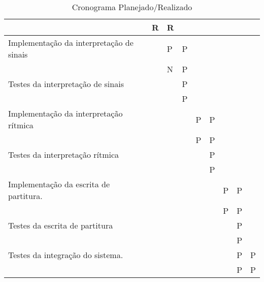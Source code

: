 {\begin{table}[]
\begin{tabular}{|p{5cm}|l|l|l|l|l|l|l|l|l|}
 &  & \cellcolor[HTML]{34FF34}R & \cellcolor[HTML]{34FF34}R &  &  &  &  &  &  \\ \hline
Implementação da interpretação de sinais &  &  & \cellcolor[HTML]{C0C0C0}P & \cellcolor[HTML]{C0C0C0}P &  &  &  &  &  \\
 &  &  & \cellcolor[HTML]{FE0000}N & \cellcolor[HTML]{C0C0C0}P &  &  &  &  &  \\ \hline
Testes da interpretação de sinais &  &  &  & \cellcolor[HTML]{C0C0C0}P &  &  &  &  &  \\
 &  &  &  & \cellcolor[HTML]{C0C0C0}P &  &  &  &  &  \\ \hline
Implementação da interpretação rítmica &  &  &  &  & \cellcolor[HTML]{C0C0C0}P & \cellcolor[HTML]{C0C0C0}P &  &  &  \\
 &  &  &  &  & \cellcolor[HTML]{C0C0C0}P & \cellcolor[HTML]{C0C0C0}P &  &  &  \\ \hline
Testes da interpretação rítmica &  &  &  &  &  & \cellcolor[HTML]{C0C0C0}P &  &  &  \\
 &  &  &  &  &  & \cellcolor[HTML]{C0C0C0}P &  &  &  \\ \hline
Implementação da escrita de partitura. &  &  &  &  &  &  & \cellcolor[HTML]{C0C0C0}P & \cellcolor[HTML]{C0C0C0}P &  \\
 &  &  &  &  &  &  & \cellcolor[HTML]{C0C0C0}P & \cellcolor[HTML]{C0C0C0}P &  \\ \hline
Testes da escrita de partitura &  &  &  &  &  &  &  & \cellcolor[HTML]{C0C0C0}P &  \\
 &  &  &  &  &  &  &  & \cellcolor[HTML]{C0C0C0}P &  \\ \hline
Testes da integração do sistema. &  &  &  &  &  &  &  & \cellcolor[HTML]{C0C0C0}P & \cellcolor[HTML]{C0C0C0}P \\
 &  &  &  &  &  &  &  & \cellcolor[HTML]{C0C0C0}P & \cellcolor[HTML]{C0C0C0}P \\ \hline
\end{tabular}
\caption{Cronograma Planejado/Realizado}
\end{table}
}

